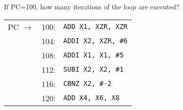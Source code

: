 \begin{frame}[fragile]
\begin{multicols}{2}
    

\begin{tcolorbox}[enhanced,attach boxed title to top center={yshift=-3mm,yshifttext=-1mm},
  colback=red!5!white,colframe=red!75!black,colbacktitle=red!80!black,
  title=Try this,fonttitle=\bfseries,
  boxed title style={size=small,colframe=red!50!black} ]
  If PC=100, how many iterations of the loop are executed?
  \begin{center}
  {\footnotesize
\begin{tabular}{rrl}
PC $\rightarrow$ &100: & \texttt{ADD X1, XZR, XZR}\\
&104: & \texttt{ADDI X2, XZR, \#6}\\
&108: & \texttt{ADDI X1, X1, \#5}\\
&112: & \texttt{SUBI X2, X2, \#1}\\
&116: & \texttt{CBNZ X2, \#-2}\\
&120: & \texttt{ADD X4, X6, X8}
\end{tabular}
}
\end{center}
\end{tcolorbox}
\columnbreak


\end{multicols}
\end{frame}
